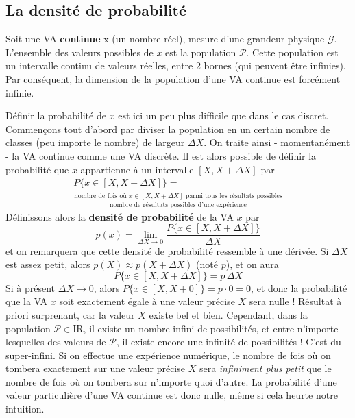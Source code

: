 \subsection{La densité de probabilité}

Soit une VA \textbf{continue} x (un nombre réel), mesure d'une grandeur physique $\mathcal{G}$. L'ensemble des valeurs possibles de $x$ est la population $\mathcal{P}$. Cette population est un intervalle continu de valeurs réelles, entre 2 bornes (qui peuvent être infinies). Par conséquent, la dimension de la population d'une VA continue est forcément infinie.

Définir la probabilité de $x$ est ici un peu plus difficile que dans le cas discret. Commençons tout d'abord par diviser la population en un certain nombre de classes (peu importe le nombre) de largeur $\Delta X$. On traite ainsi - momentanément - la VA continue comme une VA discrète. Il est alors possible de définir la probabilité que $x$ appartienne à un intervalle $[X,X+\Delta X]$ par
\begin{multline}
P\{x\in[X,X+\Delta X]\}=\\
\frac{\text{nombre de fois où $x\in[X,X+\Delta X]$ parmi tous les résultats possibles}}{\text{nombre de résultats possibles d'une expérience}}
\label{eq:ddlppuvac}
\end{multline}
Définissons alors la \textbf{densité de probabilité} de la VA $x$ par
\begin{equation}
p(x)=\lim_{\Delta X\rightarrow 0}\frac{P\{x\in[X,X+\Delta X]\}}{\Delta X}
\end{equation}
et on remarquera que cette densité de probabilité ressemble à une dérivée. Si $\Delta X$ est assez petit, alors $p(X)\approx p(X\!+\!\Delta X)$ (noté $\overline{p}$), et on aura
\begin{equation*}
P\{x\in[X,X+\Delta X]\}=\overline{p}\,\Delta X
\end{equation*}
Si à présent $\Delta X\rightarrow0$, alors $P\{x\in[X,X+0]\}=\overline{p}\cdot 0=0$, et donc la probabilité que la VA $x$ soit exactement égale à une valeur précise $X$ sera nulle ! Résultat à priori surprenant, car la valeur $X$ existe bel et bien. Cependant, dans la population $\mathcal{P}\in\text{I}\!\text{R}$, il existe un nombre infini de possibilités, et entre n'importe lesquelles des valeurs de $\mathcal{P}$, il existe encore une infinité de possibilités ! C'est du super-infini. Si on effectue une expérience numérique, le nombre de fois où on tombera exactement sur une valeur précise $X$ sera \textit{infiniment plus petit} que le nombre de fois où on tombera sur n'importe quoi d'autre. La probabilité d'une valeur particulière d'une VA continue est donc nulle, même si cela heurte notre intuition.

